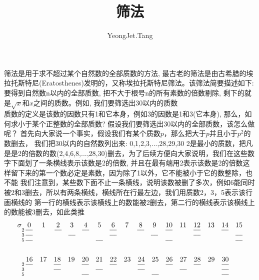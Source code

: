 \documentclass[UTF8,a4paper,zihao=-4]{article}
\title{筛法}
\newcommand\funderline{\bgroup\markoverwith
   {%
     \rule[-1ex]{2pt}{0.4pt}%
   }%
   \ULon}
\newcommand\sunderline{\bgroup\markoverwith
   {%
     \rule[-1ex]{2pt}{0pt}%
     \llap{{\rule[-2.7ex]{2pt}{0.4pt}}}%
   }%
   \ULon}
\newcommand\tunderline{\bgroup\markoverwith
   {%
     \rule[-1ex]{2pt}{0pt}%
     \llap{{\rule[-2.7ex]{2pt}{0pt}}}%
     \llap{{\rule[-4.4ex]{2pt}{0.4pt}}}%
   }%
   \ULon}
\newcommand\fsunderline{\bgroup\markoverwith
   {%
     \rule[-1ex]{2pt}{0.4pt}%
     \llap{{\rule[-2.7ex]{2pt}{0.4pt}}}%
   }%
   \ULon}
\newcommand\ftunderline{\bgroup\markoverwith
   {%
     \rule[-1ex]{2pt}{0.4pt}%
     \llap{{\rule[-2.7ex]{2pt}{0pt}}}%
     \llap{{\rule[-4.4ex]{2pt}{0.4pt}}}%
   }%
   \ULon}
\newcommand\stunderline{\bgroup\markoverwith
   {%
     \rule[-1ex]{2pt}{0pt}%
     \llap{{\rule[-2.7ex]{2pt}{0.4pt}}}%
     \llap{{\rule[-4.4ex]{2pt}{0.4pt}}}%
   }%
   \ULon}
\newcommand\fstunderline{\bgroup\markoverwith
   {%
     \rule[-1ex]{2pt}{0.4pt}%
     \llap{{\rule[-2.7ex]{2pt}{0.4pt}}}%
     \llap{{\rule[-4.4ex]{2pt}{0.4pt}}}%
   }%
   \ULon}
\begin{document}
\author{YeongJet.Tang}
\date{}
\maketitle
筛法是用于求不超过某个自然数的全部质数的方法, 最古老的筛法是由古希腊的埃拉托斯特尼(Eratosthenes)发明的，又称埃拉托斯特尼筛法。该筛法简要描述如下: 要得到自然数n以内的全部质数, 把不大于根号n的所有素数的倍数剔除, 剩下的就是$\sqrt{x}$和$x$之间的质数。例如, 我们要筛选出30以内的质数\\
质数的定义是该数的因数只有1和它本身，例如3的因数是1和3(它本身), 那么，如何求小于某个正整数的全部质数? 假设我们要筛选出30以内的全部质数，该怎么做呢？
首先向大家说一个事实，假设我们有某个质数$p$，那么把大于$p$并且小于$p^2$的数删去，
我们把30以内的自然数列出来: 0,1,2,3,...,28,29,30
2是最小的质数，把凡是是2的倍数的数(2,4,6,8,...,28,30)删去，为了后续方便向大家说明，我们在这些数字下面划了一条横线表示该数是2的倍数, 并且在最有端用2表示该数是2的倍数这样留下来的第一个数必定是素数，因为除了1以外，它不能被小于它的数整除，也不能
我们注意到，某些数下面不止一条横线，说明该数被删了多次，例如6能同时被2和3删去，所以有两条横线，横线所在行最左边，我们用质数2，3，5表示该行画横线的
第一行的横线表示该横线上的数能被2删去，第二行的横线表示该横线上的数能被3删去，如此类推
\begin{align*}
  \sigma
    &\underset{5}{\underset{3}{\underset{2}{\ }}}\hspace{0.1em}\fstunderline{\ 0\ }\hspace{0.9em}{\ 1\ }\hspace{0.9em}\funderline{\ 2\ }\hspace{0.8em}\sunderline{\ 3\ }\hspace{0.8em}\funderline{\ 4\ }\hspace{0.8em}\tunderline{\ 5\ }\hspace{0.8em}\fsunderline{\ 6\ }\hspace{0.8em}{\ 7\ }\hspace{0.8em}\funderline{\ 8\ }\hspace{0.8em}\sunderline{\ 9\ }\quad\ftunderline{10}\quad11\quad\fsunderline{12}\quad13\quad\funderline{14}\quad\stunderline{15}\\\\
    &\underset{5}{\underset{3}{\underset{2}{\ }}}\hspace{0.2em}\funderline{16}\quad17\quad\fsunderline{18}\quad19\quad\ftunderline{20}\quad\sunderline{21}\quad\funderline{22}\quad23\quad\fsunderline{24}\quad\tunderline{25}\quad\funderline{26}\quad\sunderline{27}\quad\funderline{28}\quad29\quad\fstunderline{30}
\end{align*}
\end{document}
